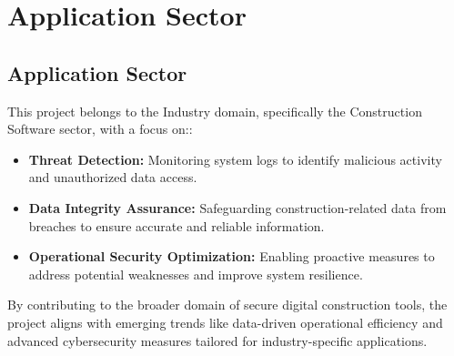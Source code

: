 %
%

\chapter{Application Sector}

\section{Application Sector}

This project belongs to the Industry domain, specifically the Construction Software sector, with a focus on::

\begin{itemize}
	\item \textbf{Threat Detection:} Monitoring system logs to identify malicious activity and unauthorized data access.
	\item \textbf{Data Integrity Assurance:} Safeguarding construction-related data from breaches to ensure accurate and reliable information.
	\item \textbf{Operational Security Optimization:} Enabling proactive measures to address potential weaknesses and improve system resilience.
\end{itemize}

By contributing to the broader domain of secure digital construction tools, the project aligns with emerging trends like data-driven operational efficiency and advanced cybersecurity measures tailored for industry-specific applications.